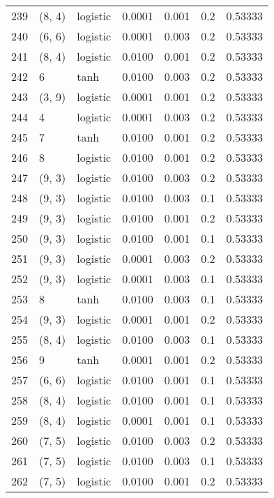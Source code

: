 \begin{tabular}{lllrrrr}
239 &      (8, 4) &  logistic &  0.0001 &  0.001 &  0.2 &   0.53333 \\
240 &      (6, 6) &  logistic &  0.0001 &  0.003 &  0.2 &   0.53333 \\
241 &      (8, 4) &  logistic &  0.0100 &  0.001 &  0.2 &   0.53333 \\
242 &           6 &      tanh &  0.0100 &  0.003 &  0.2 &   0.53333 \\
243 &      (3, 9) &  logistic &  0.0001 &  0.001 &  0.2 &   0.53333 \\
244 &           4 &  logistic &  0.0001 &  0.003 &  0.2 &   0.53333 \\
245 &           7 &      tanh &  0.0100 &  0.001 &  0.2 &   0.53333 \\
246 &           8 &  logistic &  0.0100 &  0.001 &  0.2 &   0.53333 \\
247 &      (9, 3) &  logistic &  0.0100 &  0.003 &  0.2 &   0.53333 \\
248 &      (9, 3) &  logistic &  0.0100 &  0.003 &  0.1 &   0.53333 \\
249 &      (9, 3) &  logistic &  0.0100 &  0.001 &  0.2 &   0.53333 \\
250 &      (9, 3) &  logistic &  0.0100 &  0.001 &  0.1 &   0.53333 \\
251 &      (9, 3) &  logistic &  0.0001 &  0.003 &  0.2 &   0.53333 \\
252 &      (9, 3) &  logistic &  0.0001 &  0.003 &  0.1 &   0.53333 \\
253 &           8 &      tanh &  0.0100 &  0.003 &  0.1 &   0.53333 \\
254 &      (9, 3) &  logistic &  0.0001 &  0.001 &  0.2 &   0.53333 \\
255 &      (8, 4) &  logistic &  0.0100 &  0.003 &  0.1 &   0.53333 \\
256 &           9 &      tanh &  0.0001 &  0.001 &  0.2 &   0.53333 \\
257 &      (6, 6) &  logistic &  0.0100 &  0.001 &  0.1 &   0.53333 \\
258 &      (8, 4) &  logistic &  0.0100 &  0.001 &  0.1 &   0.53333 \\
259 &      (8, 4) &  logistic &  0.0001 &  0.001 &  0.1 &   0.53333 \\
260 &      (7, 5) &  logistic &  0.0100 &  0.003 &  0.2 &   0.53333 \\
261 &      (7, 5) &  logistic &  0.0100 &  0.003 &  0.1 &   0.53333 \\
262 &      (7, 5) &  logistic &  0.0100 &  0.001 &  0.2 &   0.53333 \\

\end{tabular}
